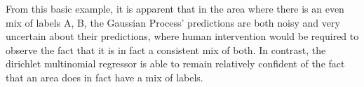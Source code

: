 
From this basic example, it is apparent that in the area where there is an even mix of labels A, B, the Gaussian Process' predictions are both noisy and very uncertain about their predictions, where human intervention would be required to observe the fact that it is in fact a consistent mix of both. In contrast, the dirichlet multinomial regressor is able to remain relatively confident of the fact that an area does in fact have a mix of labels.

